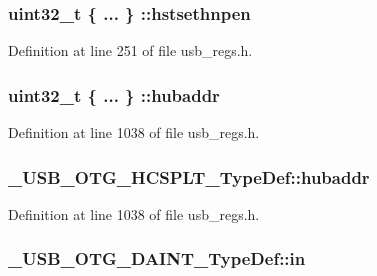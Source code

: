 \hypertarget{group___u_s_b___o_t_g___d_r_i_v_e_r_ga865d5645f59b100d4343cb6669e84e99}{
\subsubsection[{hstsethnpen}]{\setlength{\rightskip}{0pt plus 5cm}uint32\-\_\-t \{ ... \} \-::hstsethnpen}}\label{group___u_s_b___o_t_g___d_r_i_v_e_r_ga865d5645f59b100d4343cb6669e84e99}


Definition at line 251 of file usb\-\_\-regs.\-h.

\hypertarget{group___u_s_b___o_t_g___d_r_i_v_e_r_gad163893b4ada9220997acde64bd7af68}{
\subsubsection[{hubaddr}]{\setlength{\rightskip}{0pt plus 5cm}uint32\-\_\-t \{ ... \} \-::hubaddr}}\label{group___u_s_b___o_t_g___d_r_i_v_e_r_gad163893b4ada9220997acde64bd7af68}


Definition at line 1038 of file usb\-\_\-regs.\-h.

\hypertarget{group___u_s_b___o_t_g___d_r_i_v_e_r_gaae0e95bdc2670ea39a5865a11402bbf2}{
\subsubsection[{hubaddr}]{ \-\_\-\-U\-S\-B\-\_\-\-O\-T\-G\-\_\-\-H\-C\-S\-P\-L\-T\-\_\-\-Type\-Def\-::hubaddr}}\label{group___u_s_b___o_t_g___d_r_i_v_e_r_gaae0e95bdc2670ea39a5865a11402bbf2}


Definition at line 1038 of file usb\-\_\-regs.\-h.

\hypertarget{group___u_s_b___o_t_g___d_r_i_v_e_r_ga95218036397e28b27ccde01eaf9bd063}{
\subsubsection[{in}]{ \-\_\-\-U\-S\-B\-\_\-\-O\-T\-G\-\_\-\-D\-A\-I\-N\-T\-\_\-\-Type\-Def\-::in}}\label{group___u_s_b___o_t_g___d_r_i_v_e_r_ga95218036397e28b27ccde01eaf9bd063}


